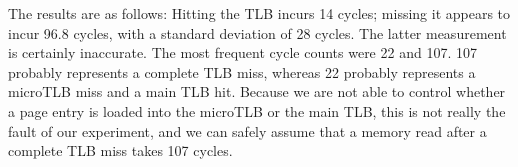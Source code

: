 \noindent The results are as follows: Hitting the TLB incurs 14 cycles; missing it appears to incur 96.8 cycles, with a standard deviation of 28 cycles. The latter measurement is certainly inaccurate. The most frequent cycle counts were 22 and 107. 107 probably represents a complete TLB miss, whereas 22 probably represents a microTLB miss and a main TLB hit. Because we are not able to control whether a page entry is loaded into the microTLB or the main TLB, this is not really the fault of our experiment, and we can safely assume that a memory read after a complete TLB miss takes 107 cycles. 